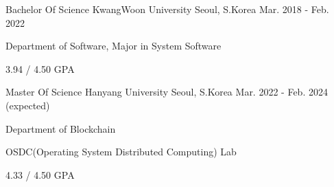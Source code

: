 

\begin{cventries}

  \cventry
    {Bachelor Of Science} %
    {KwangWoon University} %
    {Seoul, S.Korea} %
    {Mar. 2018 - Feb. 2022} %
    {
      \begin{cvitems} %
        \item {Department of Software, Major in System Software}
        \item {3.94 / 4.50 GPA}
      \end{cvitems}
    }
    
  \cventry
    {Master Of Science} %
    {Hanyang University} %
    {Seoul, S.Korea} %
    {Mar. 2022 - Feb. 2024 (expected)} %
    {
      \begin{cvitems} %
        \item {Department of Blockchain}
        \item {OSDC(Operating System Distributed Computing) Lab}
        \item { 4.33 / 4.50 GPA}
      \end{cvitems}
    }
\end{cventries}
